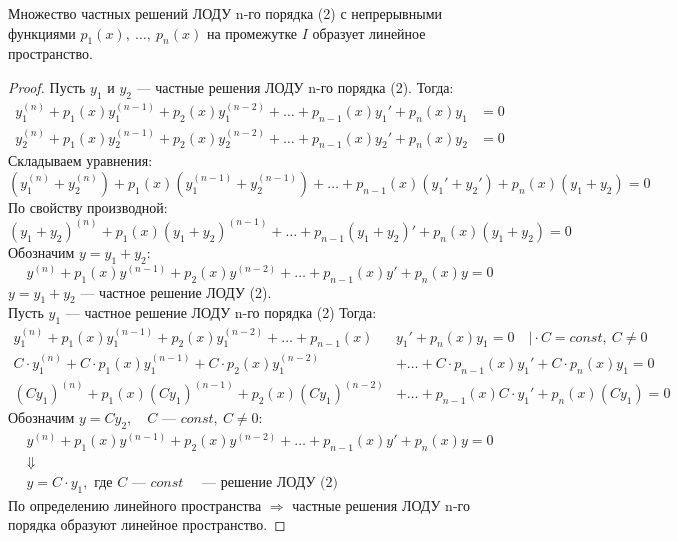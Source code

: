 \begin{theorem*}
    Множество частных решений ЛОДУ n-го порядка (2) с непрерывными функциями $p_1(x),\ \ldots,\ p_n(x)$ на промежутке $I$ образует линейное пространство.
\end{theorem*}
\begin{proof}
    Пусть $y_1$ и $y_2$ --- частные решения ЛОДУ n-го порядка (2). Тогда:
    \begin{align*}
        y_1^{(n)} + p_1(x)y_1^{(n-1)}  + p_2(x)y_1^{(n-2)} + \ldots + p_{n-1}(x)y_1' + p_n(x)y_1 &= 0 \\ 
        y_2^{(n)} + p_1(x)y_2^{(n-1)}  + p_2(x)y_2^{(n-2)} + \ldots + p_{n-1}(x)y_2' + p_n(x)y_2 &= 0
    \end{align*}
    Складываем уравнения:
    \[
        \left(y_1^{(n)} + y_2^{(n)}\right) + p_1(x)\left(y_1^{(n-1)} + y_2^{(n-1)}\right) + \ldots + p_{n-1} (x) \left(y_1' + y_2'\right) + p_n(x)\left(y_1 + y_2\right)= 0
    \]
    По свойству производной:
    \[
        (y_1 + y_2)^{(n)} + p_1(x) (y_1 + y_2)^{(n-1)} + \ldots + p_{n-1}(y_1 + y_2)' + p_n(x)(y_1 + y_2) = 0
    \]
    Обозначим $y = y_1 + y_2$:
    \[
        y^{(n)} + p_1(x)y^{(n-1)}  + p_2(x)y^{(n-2)} + \ldots + p_{n-1}(x)y' + p_n(x)y = 0
    \]
    $y = y_1 + y_2$ --- частное решение ЛОДУ (2). \\
    Пусть $y_1$ --- частное решение ЛОДУ n-го порядка (2)
    Тогда:
    \begin{align*}
        y_1^{(n)} + p_1(x)y_1^{(n-1)}  + p_2(x)y_1^{(n-2)} + \ldots + p_{n-1}(x)&y_1' + p_n(x)y_1 = 0\quad \Big| \cdot C = const,\ C \ne 0 \\
        C\cdot y_1^{(n)} + C\cdot p_1(x)y_1^{(n-1)}  + C\cdot p_2(x) y_1^{(n-2)} &+ \ldots + C\cdot p_{n-1}(x) y_1' + C\cdot p_n(x) y_1 = 0 \\
        (C y_1)^{(n)} + p_1(x)(Cy_1)^{(n-1)}  + p_2(x)(Cy_1)^{(n-2)} &+ \ldots + p_{n-1}(x)C\cdot y_1' + p_n(x)(C y_1) = 0
    \end{align*}
    Обозначим $y = Cy_2,\quad C \text{ --- } const,\ C \ne 0$:
    \begin{gather*}
        y^{(n)} + p_1(x)y^{(n-1)}  + p_2(x)y^{(n-2)} + \ldots + p_{n-1}(x)y' + p_n(x)y = 0 \\
        \Downarrow \\
        y = C\cdot y_1, \text{ где } C \text{ --- } const\quad \text{ --- решение ЛОДУ (2)} 
    \end{gather*}
    По определению линейного пространства $\Rightarrow$ частные решения ЛОДУ n-го порядка образуют линейное пространство.
\end{proof}

